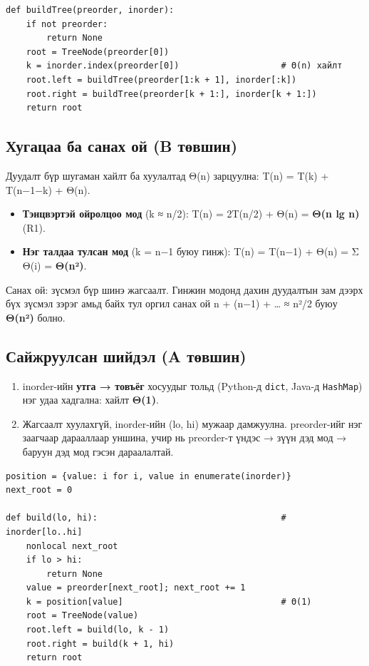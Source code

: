\documentclass[11pt,a4paper]{article}
\begin{document}
\begin{Verbatim}
def buildTree(preorder, inorder):
    if not preorder:
        return None
    root = TreeNode(preorder[0])
    k = inorder.index(preorder[0])                    # Θ(n) хайлт
    root.left = buildTree(preorder[1:k + 1], inorder[:k])
    root.right = buildTree(preorder[k + 1:], inorder[k + 1:])
    return root
\end{Verbatim}

\subsection{Хугацаа ба санах ой (B төвшин)}
Дуудалт бүр шугаман хайлт ба хуулалтад Θ(n) зарцуулна: T(n) = T(k) + T(n−1−k) + Θ(n).
\begin{itemize}
\item \textbf{Тэнцвэртэй ойролцоо мод} (k ≈ n/2): T(n) = 2T(n/2) + Θ(n) = \textbf{Θ(n lg n)} (R1).
\item \textbf{Нэг талдаа тулсан мод} (k = n−1 буюу гинж): T(n) = T(n−1) + Θ(n) = Σ Θ(i) = \textbf{Θ(n²)}.
\end{itemize}

Санах ой: зүсмэл бүр шинэ жагсаалт. Гинжин модонд дахин дуудалтын зам дээрх бүх зүсмэл зэрэг амьд байх тул оргил санах ой n + (n−1) + … ≈ n²/2 буюу \textbf{Θ(n²)} болно.

\subsection{Сайжруулсан шийдэл (A төвшин)}
\begin{enumerate}
\item inorder-ийн \textbf{утга → товъёг} хосуудыг тольд (Python-д \texttt{dict}, Java-д \texttt{HashMap}) нэг удаа хадгална: хайлт \textbf{Θ(1)}.
\item Жагсаалт хуулахгүй, inorder-ийн (lo, hi) мужаар дамжуулна. preorder-ийг нэг заагчаар дарааллаар уншина, учир нь preorder-т үндэс → зүүн дэд мод → баруун дэд мод гэсэн дараалалтай.
\end{enumerate}

\begin{Verbatim}
position = {value: i for i, value in enumerate(inorder)}
next_root = 0

def build(lo, hi):                                    # inorder[lo..hi]
    nonlocal next_root
    if lo > hi:
        return None
    value = preorder[next_root]; next_root += 1
    k = position[value]                               # Θ(1)
    root = TreeNode(value)
    root.left = build(lo, k - 1)
    root.right = build(k + 1, hi)
    return root
\end{Verbatim}
\end{document}
